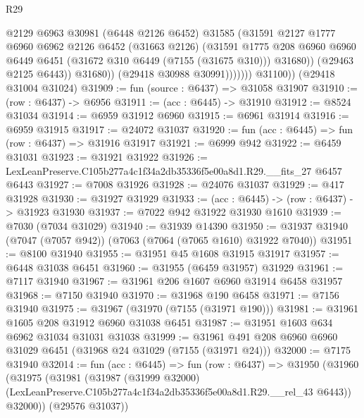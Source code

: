 \begin{lexlean}{R29}
\begin{coremodule}
                          @2129
                          @6963
                          @30981
                          (@6448 @2126 @6452)
                          @31585
                          (@31591
                            @2127
                            @1777
                            @6960
                            @6962
                            @2126
                            @6452
                            (@31663 @2126)
                            (@31591
                              @1775
                              @208
                              @6960
                              @6960
                              @6449
                              @6451
                              (@31672 @310 @6449 (@7155 (@31675 @310)))
                              @31680))
                          (@29463 @2125 @6443))
                        @31680))
                    (@29418 @30988 @30991)))))))
        @31100))
    (@29418 @31004 @31024)
@31909 := fun (source : @6437) => @31058 @31907
@31910 := (row : @6437) -> @6956
@31911 := (acc : @6445) -> @31910
@31912 := @8524 @31034
@31914 := @6959 @31912 @6960
@31915 := @6961 @31914
@31916 := @6959 @31915
@31917 := @24072 @31037
@31920 := fun (acc : @6445) => fun (row : @6437) => @31916 @31917
@31921 := @6999 @942
@31922 := @6459 @31031
@31923 := @31921 @31922
@31926 := LexLeanPreserve.C105b277a4c1f34a2db35336f5e00a8d1.R29.__fits_27 @6457 @6443
@31927 := @7008 @31926
@31928 := @24076 @31037
@31929 := @417 @31928
@31930 := @31927 @31929
@31933 := (acc : @6445) -> (row : @6437) -> @31923 @31930
@31937 := @7022 @942 @31922 @31930 @1610
@31939 := @7030 (@7034 @31029)
@31940 := @31939 @14390
@31950 := @31937 @31940 (@7047 (@7057 @942)) (@7063 (@7064 (@7065 @1610) @31922 @7040))
@31951 := @8100 @31940
@31955 := @31951 @45 @1608 @31915 @31917
@31957 := @6448 @31038 @6451
@31960 := @31955 (@6459 @31957) @31929
@31961 := @7117 @31940
@31967 := @31961 @206 @1607 @6960 @31914 @6458 @31957
@31968 := @7150 @31940
@31970 := @31968 @190 @6458
@31971 := @7156 @31940
@31975 := @31967 (@31970 (@7155 (@31971 @190)))
@31981 := @31961 @1605 @208 @31912 @6960 @31038 @6451
@31987 := @31951 @1603 @634 @6962 @31034 @31031 @31038
@31999 := @31961 @491 @208 @6960 @6960 @31029 @6451 (@31968 @24 @31029 (@7155 (@31971 @24)))
@32000 := @7175 @31940
@32014 := fun (acc : @6445) =>
  fun (row : @6437) =>
  @31950
    (@31960
      (@31975
        (@31981
          (@31987
            (@31999 @32000)
            (LexLeanPreserve.C105b277a4c1f34a2db35336f5e00a8d1.R29.__rel_43 @6443))
          @32000))
      (@29576 @31037))

\end{coremodule}
\end{lexlean}
